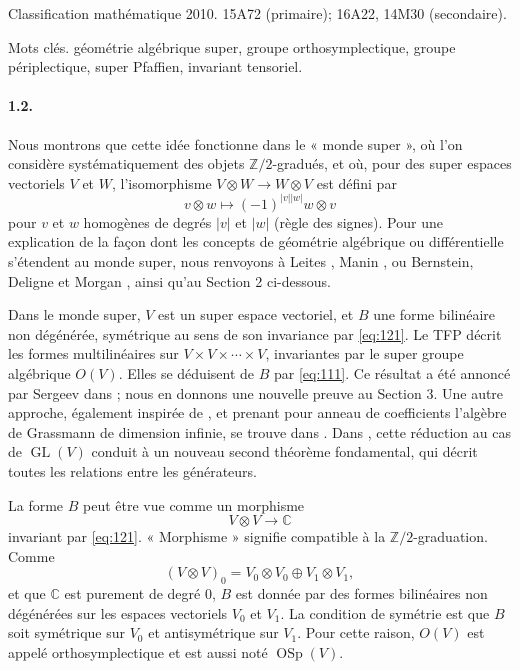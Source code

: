 \documentclass[11pt]{article}
\newcommand{\C}{\mathbb C}
\newcommand{\Z}{\mathbb Z}
\newcommand{\GL}{\operatorname{GL}}
\newcommand{\OSp}{\operatorname{OSp}}
\begin{document}
\medskip
\noindent Classification mathématique 2010. 15A72 (primaire); 16A22, 14M30 (secondaire).\par
\noindent Mots clés. géométrie algébrique super, groupe orthosymplectique, groupe périplectique, super Pfaffien, invariant tensoriel.

\paragraph{1.2.}
Nous montrons que cette idée fonctionne dans le « monde super », où l'on considère systématiquement des objets $\Z/2$-gradués, et où, pour des super espaces vectoriels $V$ et $W$, l'isomorphisme $V\otimes W\to W\otimes V$ est défini par
\begin{equation}
\label{eq:121}
v\otimes w\longmapsto (-1)^{|v||w|}w\otimes v
\end{equation}
pour $v$ et $w$ homogènes de degrés $|v|$ et $|w|$ (règle des signes). Pour une explication de la façon dont les concepts de géométrie algébrique ou différentielle s'étendent au monde super, nous renvoyons à Leites \cite{Lei90}, Manin \cite{Man88}, ou Bernstein, Deligne et Morgan \cite{DM99}, ainsi qu'au Section 2 ci-dessous.

Dans le monde super, $V$ est un super espace vectoriel, et $B$ une forme bilinéaire non dégénérée, symétrique au sens de son invariance par \eqref{eq:121}. Le TFP décrit les formes multilinéaires sur $V\times V\times\cdots\times V$, invariantes par le super groupe algébrique $O(V)$. Elles se déduisent de $B$ par \eqref{eq:111}. Ce résultat a été annoncé par Sergeev dans \cite{Ser92}; nous en donnons une nouvelle preuve au Section 3. Une autre approche, également inspirée de \cite{ABP73}, et prenant pour anneau de coefficients l'algèbre de Grassmann de dimension infinie, se trouve dans \cite{LZ14a}. Dans \cite{LZ14b}, cette réduction au cas de $\GL(V)$ conduit à un nouveau second théorème fondamental, qui décrit toutes les relations entre les générateurs.

La forme $B$ peut être vue comme un morphisme
\[
V\otimes V\longrightarrow \C
\]
invariant par \eqref{eq:121}. « Morphisme » signifie compatible à la $\Z/2$-graduation. Comme
\[
(V\otimes V)_0=V_0\otimes V_0\oplus V_1\otimes V_1,
\]
et que $\C$ est purement de degré $0$, $B$ est donnée par des formes bilinéaires non dégénérées sur les espaces vectoriels $V_0$ et $V_1$. La condition de symétrie est que $B$ soit symétrique sur $V_0$ et antisymétrique sur $V_1$. Pour cette raison, $O(V)$ est appelé orthosymplectique et est aussi noté $\OSp(V)$.
\end{document}
